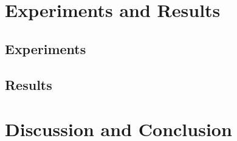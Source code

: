 \documentclass[10pt,twocolumn,letterpaper]{article}
\begin{document}
\section{Experiments and Results}
\label{sec:results}
\subsection{Experiments}

\subsection{Results}

\section{Discussion and Conclusion}
\label{sec:conclusion}
{\small


}
\end{document}
